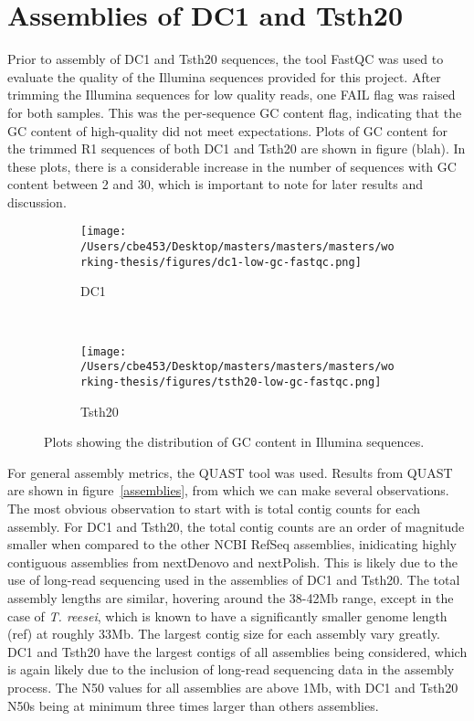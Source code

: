 \section{Assemblies of DC1 and Tsth20}

Prior to assembly of DC1 and Tsth20 sequences, the tool FastQC was
used to evaluate the quality of the Illumina sequences provided for
this project. After trimming the Illumina sequences for low quality
reads, one FAIL flag was raised for both samples. This was the
per-sequence GC content flag, indicating that the GC content of
high-quality did not meet expectations. Plots of GC content for the
trimmed R1 sequences of both DC1 and Tsth20 are shown in figure
(blah). In these plots, there is a considerable increase in the number
of sequences with GC content between 2 and 30, which is important to
note for later results and discussion.

\begin{figure}
  \centering
  \begin{subfigure}{0.8\textwidth}
    \texttt{[image: /Users/cbe453/Desktop/masters/masters/masters/working-thesis/figures/dc1-low-gc-fastqc.png]}
    \caption{DC1}
    \label{fig:dc1fastqc}
  \end{subfigure}
  \\
  \begin{subfigure}{0.8\textwidth}
  \texttt{[image: /Users/cbe453/Desktop/masters/masters/masters/working-thesis/figures/tsth20-low-gc-fastqc.png]}
    \caption{Tsth20}
    \label{fig:tsth20fastqc}
  \end{subfigure}
  \caption{Plots showing the distribution of GC content in Illumina
    sequences.}
  \label{fig:fastqc-lowgc}
\end{figure}

For general assembly metrics, the QUAST tool was used. Results from
QUAST are shown in figure~\ref{assemblies}, from which we can make
several observations. The most obvious observation to start with is
total contig counts for each assembly. For DC1 and Tsth20, the total
contig counts are an order of magnitude smaller when compared to the
other NCBI RefSeq assemblies, inidicating highly contiguous assemblies
from nextDenovo and nextPolish. This is likely due to the use of
long-read sequencing used in the assemblies of DC1 and Tsth20. The
total assembly lengths are similar, hovering around the 38-42Mb range,
except in the case of \textit{T. reesei}, which is known to have a
significantly smaller genome length (ref) at roughly 33Mb. The largest
contig size for each assembly vary greatly. DC1 and Tsth20 have the
largest contigs of all assemblies being considered, which is again
likely due to the inclusion of long-read sequencing data in the
assembly process. The N50 values for all assemblies are above 1Mb,
with DC1 and Tsth20 N50s being at minimum three times larger than
others assemblies.


